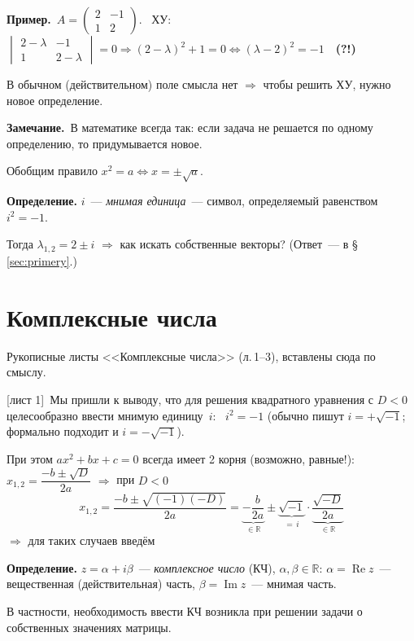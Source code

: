 \documentclass[a4paper,11pt]{article}
\newcommand{\zam}{\textbf{Замечание.}\ }
\newcommand{\prim}{\textbf{Пример.}\ }
\newcommand{\hwlist}[1]{{\small\color{gray}[#1]}}
\newcommand{\Rez}{\operatorname{Re}}
\newcommand{\Imz}{\operatorname{Im}}
\begin{document}
\prim $A=\begin{pmatrix}2&-1\\1&2\end{pmatrix}$. \ ХУ:
$\begin{vmatrix}2-\lambda&-1\\1&2-\lambda\end{vmatrix}=0\Rightarrow(2-\lambda)^2+1=0
\iff(\lambda-2)^2=-1$\ \ \textbf{(?!)}

В обычном (действительном) поле смысла нет $\Rightarrow$ чтобы решить ХУ, нужно новое определение.

\zam В математике всегда так: если задача не решается по одному определению, то придумывается новое.

Обобщим правило $x^2=a\iff x=\pm\sqrt a$.
\begin{opr}
\textbf{Определение.} $i$~--- \emph{мнимая единица}~--- символ, определяемый равенством $i^2=-1$.
\end{opr}
Тогда $\lambda_{1,2}=2\pm i$ $\Rightarrow$ как искать собственные векторы? (Ответ~--- в \S\,\ref{sec:primery}.)

\section{Комплексные числа}\label{sec:kch}
\begin{hwbox}
Рукописные листы <<Комплексные числа>> (л.\,1--3), вставлены сюда по смыслу.
\end{hwbox}
\hwlist{лист 1}\ Мы пришли к выводу, что для решения квадратного уравнения с $D<0$ целесообразно ввести
мнимую единицу~$i$: \ $i^2=-1$ (обычно пишут $i=+\sqrt{-1}$; формально подходит и $i=-\sqrt{-1}$).

При этом $ax^2+bx+c=0$ всегда имеет 2 корня (возможно, равные!):
$x_{1,2}=\dfrac{-b\pm\sqrt D}{2a}$ $\Rightarrow$ при $D<0$
\[
x_{1,2}=\frac{-b\pm\sqrt{(-1)(-D)}}{2a}
=\underbrace{-\frac{b}{2a}}_{\in\mathbb R}\pm\underbrace{\sqrt{-1}}_{=\,i}\cdot\underbrace{\frac{\sqrt{-D}}{2a}}_{\in\mathbb R}
\]
$\Rightarrow$ для таких случаев введём
\begin{opr}
\textbf{Определение.} $z=\alpha+i\beta$~--- \emph{комплексное число} (КЧ), $\alpha,\beta\in\mathbb R$:
$\alpha=\Rez z$~--- вещественная (действительная) часть, $\beta=\Imz z$~--- мнимая часть.
\end{opr}
В частности, необходимость ввести КЧ возникла при решении задачи о собственных значениях матрицы.
\end{document}
